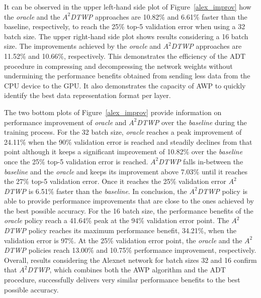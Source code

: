 It can be observed in the upper left-hand side plot of Figure~\ref{alex_improv} how 
the \textit{oracle} and the \textit{$A^2$DTWP} approaches are 10.82\% and 6.61\% faster than the baseline, respectively, to reach the 25\% top-5 validation error when using a 32 batch size.
The upper right-hand side plot shows results considering a 16 batch size. 
The improvements achieved by the 
\textit{oracle} and \textit{$A^2$DTWP} approaches are 11.52\% and 10.66\%, respectively.
This demonstrates 
the efficiency of the ADT procedure in compressing and decompressing the network weights without undermining the performance benefits obtained from sending less data
from the CPU device to the GPU.
It also demonstrates the capacity of AWP to quickly identify the best data representation format per layer.

The two bottom plots of Figure~\ref{alex_improv} provide information on 
performance improvement of \textit{oracle} and \textit{$A^2$DTWP} over the \textit{baseline} during the training process.
For the 32 batch size, \textit{oracle} reaches a peak improvement of 24.11\% when the 90\%  
validation error is reached and steadily declines from that point although it keeps a significant 
improvement of 10.82\% over the \textit{baseline} once the 25\% top-5 validation error is reached. 
\textit{$A^2$DTWP} falls in-between the \textit{baseline} and the \textit{oracle}  
and keeps its improvement above 7.03\% until it reaches the 27\% top-5 validation error.
Once it reaches the 25\% validation error \textit{$A^2$DTWP} is 6.51\% faster than the \textit{baseline}.
In conclusion, the \textit{$A^2$DTWP} policy is able to provide performance 
improvements that are close to the ones achieved by the best possible accuracy.
For the 16 batch size, the performance benefits of the 
\textit{oracle} policy reach a 41.64\% peak at the 94\% validation error point.
The \textit{$A^2$DTWP} policy reaches its maximum performance benefit, 34.21\%, when the validation error is 97\%.
At the 25\% validation error point, the \textit{oracle} and the 
\textit{$A^2$DTWP} policies reach 13.00\% and 10.75\% performance improvement, respectively.
Overall, results considering the Alexnet network for batch sizes 
32 and 16 confirm that \textit{$A^2$DTWP}, which combines both the 
AWP algorithm and the ADT procedure, successfully delivers very similar 
performance benefits to the best possible accuracy.

